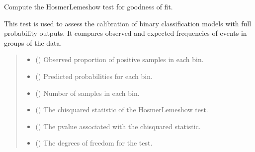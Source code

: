 \documentclass[letterpaper,10pt,english]{sphinxmanual}
\begin{document}
\begin{fulllineitems}
\label{\detokenize{calzone:calzone.metrics.hosmer_lemeshow_test}}
\pysigstartsignatures
{}
\pysigstopsignatures
\sphinxAtStartPar
Compute the Hosmer\sphinxhyphen{}Lemeshow test for goodness of fit.

\sphinxAtStartPar
This test is used to assess the calibration of binary classification models with full probability outputs.
It compares observed and expected frequencies of events in groups of the data.
\begin{quote}\begin{description}
\begin{itemize}
\item {} 
\sphinxAtStartPar
{} () \textendash{} Observed proportion of positive samples in each bin.

\item {} 
\sphinxAtStartPar
{} () \textendash{} Predicted probabilities for each bin.

\item {} 
\sphinxAtStartPar
{} () \textendash{} Number of samples in each bin.

\end{itemize}

\begin{itemize}
\item {} 
\sphinxAtStartPar
{} () \textendash{} The chi\sphinxhyphen{}squared statistic of the Hosmer\sphinxhyphen{}Lemeshow test.

\item {} 
\sphinxAtStartPar
{} () \textendash{} The p\sphinxhyphen{}value associated with the chi\sphinxhyphen{}squared statistic.

\item {} 
\sphinxAtStartPar
{} () \textendash{} The degrees of freedom for the test.


\end{itemize}
\end{description}
\end{quote}
\end{fulllineitems}
\end{document}
